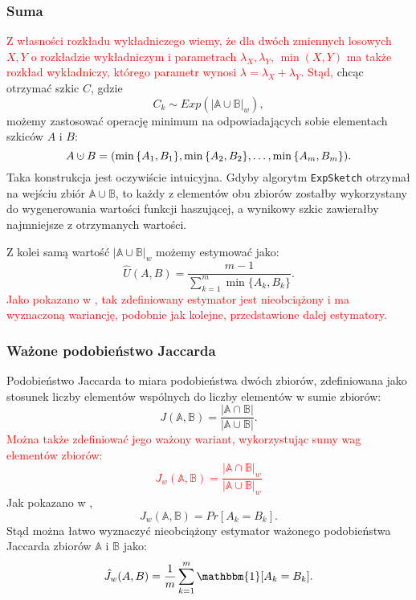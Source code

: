     \subsubsection*{Suma}
    \textcolor{red}{Z własności rozkładu wykładniczego wiemy, że dla dwóch zmiennych losowych $X, Y$ o rozkładzie wykładniczym i parametrach $\lambda_X, \lambda_Y$, $\min(X, Y)$ ma także rozkład wykładniczy, którego parametr wynosi $\lambda = \lambda_X + \lambda_Y$. Stąd, }chcąc otrzymać szkic $C$, gdzie 
    \[
        C_k \sim Exp(|\mathbb{A} \cup \mathbb{B}|_{w}), 
    \]
    możemy zastosować operację minimum na odpowiadających sobie elementach szkiców $A$ i $B$:    
    \[
        A \mathbin{\mathaccent\cdot\cup} B = (\min{\{A_1, B_1\}}, \min{\{A_2, B_2\}}, \dots, \min{\{A_m, B_m\}}).
    \]
    Taka konstrukcja jest oczywiście intuicyjna. Gdyby algorytm \texttt{ExpSketch} otrzymał na wejściu zbiór $\mathbb{A} \cup \mathbb{B}$, to każdy z elementów obu zbiorów zostałby wykorzystany do wygenerowania wartości funkcji haszującej, a wynikowy szkic zawierałby najmniejsze z otrzymanych wartości.
    
    Z kolei samą wartość $|\mathbb{A} \cup \mathbb{B}|_{w}$ możemy estymować jako:
    \[
        \hat{U}(A, B) = \frac{m - 1}{\sum\limits_{k = 1}^{m} \min{\{A_k, B_k\}}} .
    \]
    \textcolor{red}{Jako pokazano w \cite{Lemiesz_2023}, tak zdefiniowany estymator jest nieobciążony i ma wyznaczoną wariancję, podobnie jak kolejne, przedstawione dalej estymatory.}

    \subsubsection*{Ważone podobieństwo Jaccarda} 
    Podobieństwo Jaccarda to miara podobieństwa dwóch zbiorów, zdefiniowana jako stosunek liczby elementów wspólnych do liczby elementów w sumie zbiorów:
    \[
        J(\mathbb{A}, \mathbb{B}) = \frac{|\mathbb{A} \cap \mathbb{B}|}{|\mathbb{A} \cup \mathbb{B}|}.
    \]
    \textcolor{red}{Można także zdefiniować jego ważony wariant, wykorzystując sumy wag elementów zbiorów:
    \[
        J_w(\mathbb{A}, \mathbb{B}) = \frac{|\mathbb{A} \cap \mathbb{B}|_w}{|\mathbb{A} \cup \mathbb{B}|_w}
    \]}
    Jak pokazano w \cite{Lemiesz_2021}, 
    \[
        J_w(\mathbb{A}, \mathbb{B}) = Pr[A_k = B_k]. 
    \]
    Stąd można łatwo wyznaczyć nieobciążony estymator ważonego podobieństwa Jaccarda zbiorów $\mathbb{A}$ i $\mathbb{B}$ jako:
    \[
        \hat{J}_w(A, B) = \frac{1}{m} \sum\limits_{k = 1}^{m} \mathbbm{1}[A_k = B_k].  
    \]

